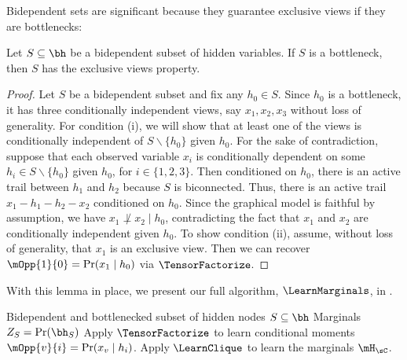 Bidependent sets are significant because they guarantee exclusive views if they are bottlenecks:
\begin{lemma}
  \label{lem:bottleneck-views}  
  Let $S \subseteq \bh$ be a bidependent subset of hidden variables.
  If $S$ is a bottleneck, then $S$ has the exclusive views property.
\end{lemma}
\begin{proof}
Let $S$ be a bidependent subset and fix any $h_0 \in S$.
Since $h_0$ is a bottleneck, it has three conditionally independent views,
say $x_1, x_2, x_3$ without loss of generality. 
For condition (i), we will show that at least one of the views is conditionally independent
of $S \backslash \{ h_0 \}$ given $h_0$.
For the sake of contradiction, 
suppose that each observed variable $x_i$ is conditionally dependent on some
$h_i \in S \backslash \{h_0\}$ given $h_0$, for $i \in \{1, 2, 3\}$.
Then conditioned on $h_0$,
there is an active trail between $h_1$ and $h_2$ because $S$ is biconnected.
Thus, there is an active trail $x_1 - h_1 - h_2 - x_2$ conditioned on $h_0$.
Since the graphical model is faithful by assumption, we have $x_1 \not\perp x_2 \mid h_0$,
contradicting the fact that $x_1$ and $x_2$ are conditionally independent given $h_0$.
To show condition (ii), assume, without loss of generality, that $x_1$ is an exclusive view.
Then we can recover $\mOpp{1}{0} = \Pr(x_1 \mid h_0)$ via $\TensorFactorize$.
\end{proof}

With this lemma in place, we present our full algorithm, $\LearnMarginals$,
in .

\begin{algorithm}
  \caption{\LearnMarginals}
  \label{algo:directed}
  \begin{algorithmic}
    \REQUIRE Bidependent and bottlenecked subset of hidden nodes $S \subseteq \bh$
    \ENSURE Marginals $Z_S = \Pr(\bh_S)$ %
      \STATE Apply $\TensorFactorize$ to learn conditional moments
      $\mOpp{v}{i} = \Pr(x_v \mid h_i)$.
    \ENDFOR
    \STATE Apply $\LearnClique$ to learn the marginals $\mH_\sC$.
  \end{algorithmic}
\end{algorithm}


